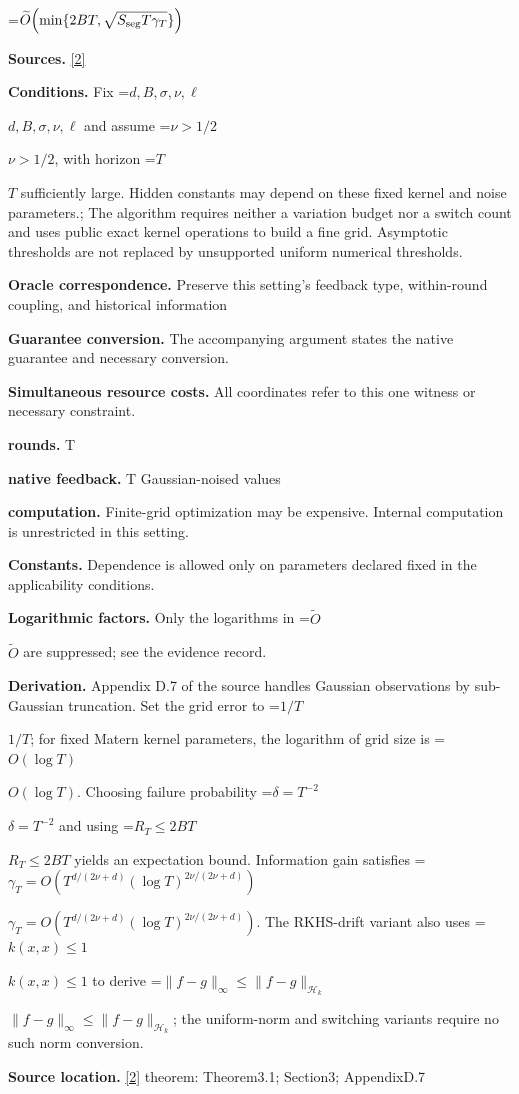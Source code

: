 \documentclass[10pt,a4paper]{article}
\newcommand{\AtlasMath}[1]{\par\begingroup\centering\setbox0=\hbox{$\displaystyle #1$}\ifdim\wd0>1.4\linewidth\typeout{ATLAS WIDE FORMULA: \the\wd0}\fi\ifdim\wd0>\linewidth\resizebox{\linewidth}{!}{\box0}\else\box0\fi\par\endgroup}
\newcommand{\AtlasInlineMath}[1]{\begingroup\setbox0=\hbox{$#1$}\ifdim\wd0>.4\linewidth\endgroup\AtlasMath{#1}\else\endgroup$#1$\fi}
\begin{document}
\AtlasMath{\widetilde{O}\!\left(\min\{2BT,\sqrt{S_{\rm seg}T\gamma_T}\}\right)}
\textbf{Sources.} \href{https://proceedings.mlr.press/v206/hong23b.html}{[2]}

\textbf{Conditions.} Fix \AtlasInlineMath{d,B,\sigma,\nu,\ell} and assume \AtlasInlineMath{\nu>1/2}, with horizon \AtlasInlineMath{T} sufficiently large. Hidden constants may depend on these fixed kernel and noise parameters.; The algorithm requires neither a variation budget nor a switch count and uses public exact kernel operations to build a fine grid. Asymptotic thresholds are not replaced by unsupported uniform numerical thresholds.

\textbf{Oracle correspondence.} Preserve this setting's feedback type, within-round coupling, and historical information

\textbf{Guarantee conversion.} The accompanying argument states the native guarantee and necessary conversion.

\textbf{Simultaneous resource costs.} All coordinates refer to this one witness or necessary constraint.

\textbf{rounds.} T

\textbf{native feedback.} T Gaussian-noised values

\textbf{computation.} Finite-grid optimization may be expensive. Internal computation is unrestricted in this setting.

\textbf{Constants.} Dependence is allowed only on parameters declared fixed in the applicability conditions.

\textbf{Logarithmic factors.} Only the logarithms in \AtlasInlineMath{\widetilde O} are suppressed; see the evidence record.

\textbf{Derivation.} Appendix D.7 of the source handles Gaussian observations by sub-Gaussian truncation. Set the grid error to \AtlasInlineMath{1/T}; for fixed Matern kernel parameters, the logarithm of grid size is \AtlasInlineMath{O(\log T)}. Choosing failure probability \AtlasInlineMath{\delta=T^{-2}} and using \AtlasInlineMath{R_T\le2BT} yields an expectation bound. Information gain satisfies \AtlasInlineMath{\gamma_T=O(T^{d/(2\nu+d)}(\log T)^{2\nu/(2\nu+d)})}. The RKHS-drift variant also uses \AtlasInlineMath{k(x,x)\le1} to derive \AtlasInlineMath{\|f-g\|_\infty\le\|f-g\|_{\mathcal H_k}}; the uniform-norm and switching variants require no such norm conversion.

\textbf{Source location.} \href{https://proceedings.mlr.press/v206/hong23b.html}{[2]} theorem: Theorem3.1; Section3; AppendixD.7
\end{document}
